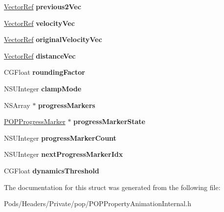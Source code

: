 \begin{DoxyCompactItemize}
\mbox{\hyperlink{namespace_p_o_p_ae9f6819a2172ed569526091e357712f5}{Vector\+Ref}} {\bfseries previous2\+Vec}
\item 
\mbox{\label{struct___p_o_p_property_animation_state_afd9861f327ff518f39093c870f42432a}} 
\mbox{\hyperlink{namespace_p_o_p_ae9f6819a2172ed569526091e357712f5}{Vector\+Ref}} {\bfseries velocity\+Vec}
\item 
\mbox{\label{struct___p_o_p_property_animation_state_ad0187a3179411e70a9185026f7b1a3f9}} 
\mbox{\hyperlink{namespace_p_o_p_ae9f6819a2172ed569526091e357712f5}{Vector\+Ref}} {\bfseries original\+Velocity\+Vec}
\item 
\mbox{\label{struct___p_o_p_property_animation_state_a249e87fd047e3fac3cf670962da27de7}} 
\mbox{\hyperlink{namespace_p_o_p_ae9f6819a2172ed569526091e357712f5}{Vector\+Ref}} {\bfseries distance\+Vec}
\item 
\mbox{\label{struct___p_o_p_property_animation_state_a0edc00df52acbe63a47feef419275fb6}} 
C\+G\+Float {\bfseries rounding\+Factor}
\item 
\mbox{\label{struct___p_o_p_property_animation_state_a64e5ceb3eca688592bdc0b23f0042b53}} 
N\+S\+U\+Integer {\bfseries clamp\+Mode}
\item 
\mbox{\label{struct___p_o_p_property_animation_state_a6dbd2496e2ddb752918c0e25f40c10e5}} 
N\+S\+Array $\ast$ {\bfseries progress\+Markers}
\item 
\mbox{\label{struct___p_o_p_property_animation_state_abd3f9bbfc100f4c549bdce00114a9b40}} 
\mbox{\hyperlink{struct_p_o_p_progress_marker}{P\+O\+P\+Progress\+Marker}} $\ast$ {\bfseries progress\+Marker\+State}
\item 
\mbox{\label{struct___p_o_p_property_animation_state_ac63a478061e80f09e336367c8759e04b}} 
N\+S\+U\+Integer {\bfseries progress\+Marker\+Count}
\item 
\mbox{\label{struct___p_o_p_property_animation_state_ab39c295fc40d0e5ee991904024c60167}} 
N\+S\+U\+Integer {\bfseries next\+Progress\+Marker\+Idx}
\item 
\mbox{\label{struct___p_o_p_property_animation_state_a9c1801f51a816673ae6fd7e5537bbec6}} 
C\+G\+Float {\bfseries dynamics\+Threshold}
\end{DoxyCompactItemize}


The documentation for this struct was generated from the following file\+:\begin{DoxyCompactItemize}
\item 
Pods/\+Headers/\+Private/pop/P\+O\+P\+Property\+Animation\+Internal.\+h\end{DoxyCompactItemize}
